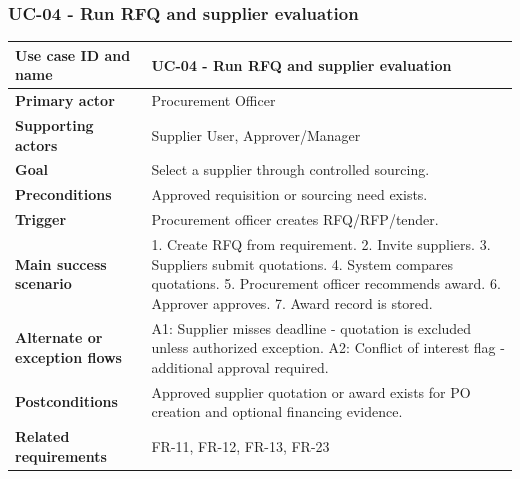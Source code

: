 \documentclass[11pt,a4paper]{article}
\begin{document}
\subsubsection{UC-04 - Run RFQ and supplier evaluation}
\begin{footnotesize}
\begin{longtable}{@{}p{}p{}@{}}
\rowcolor{gray!10}\textbf{Use case ID and name} & UC-04 - Run RFQ and supplier evaluation \\ \hline
\rowcolor{gray!10}\textbf{Primary actor} & Procurement Officer \\ \hline
\rowcolor{gray!10}\textbf{Supporting actors} & Supplier User, Approver/Manager \\ \hline
\rowcolor{gray!10}\textbf{Goal} & Select a supplier through controlled sourcing. \\ \hline
\rowcolor{gray!10}\textbf{Preconditions} & Approved requisition or sourcing need exists. \\ \hline
\rowcolor{gray!10}\textbf{Trigger} & Procurement officer creates RFQ/RFP/tender. \\ \hline
\rowcolor{gray!10}\textbf{Main success scenario} & 1. Create RFQ from requirement. 2. Invite suppliers. 3. Suppliers submit quotations. 4. System compares quotations. 5. Procurement officer recommends award. 6. Approver approves. 7. Award record is stored. \\ \hline
\rowcolor{gray!10}\textbf{Alternate or exception flows} & A1: Supplier misses deadline - quotation is excluded unless authorized exception. A2: Conflict of interest flag - additional approval required. \\ \hline
\rowcolor{gray!10}\textbf{Postconditions} & Approved supplier quotation or award exists for PO creation and optional financing evidence. \\ \hline
\rowcolor{gray!10}\textbf{Related requirements} & FR-11, FR-12, FR-13, FR-23 \\ \hline
\end{longtable}
\end{footnotesize}
\end{document}
